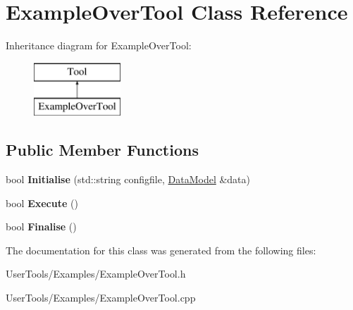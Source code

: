 \hypertarget{classExampleOverTool}{\section{Example\-Over\-Tool Class Reference}
\label{classExampleOverTool}
}
Inheritance diagram for Example\-Over\-Tool\-:\begin{figure}[H]
\begin{center}
\leavevmode
\includegraphics[height=2.000000cm]{classExampleOverTool}
\end{center}
\end{figure}
\subsection*{Public Member Functions}
\begin{DoxyCompactItemize}
\item 
\hypertarget{classExampleOverTool_ac7821b52bdffd736c9f4bb7265f2403c}{bool {\bfseries Initialise} (std\-::string configfile, \hyperlink{classDataModel}{Data\-Model} \&data)}\label{classExampleOverTool_ac7821b52bdffd736c9f4bb7265f2403c}

\item 
\hypertarget{classExampleOverTool_ae43f1902d5b79f6b474ba4b173ab0264}{bool {\bfseries Execute} ()}\label{classExampleOverTool_ae43f1902d5b79f6b474ba4b173ab0264}

\item 
\hypertarget{classExampleOverTool_aaf2c1cee9746ed6e94a9d58d8bc9fcae}{bool {\bfseries Finalise} ()}\label{classExampleOverTool_aaf2c1cee9746ed6e94a9d58d8bc9fcae}

\end{DoxyCompactItemize}


The documentation for this class was generated from the following files\-:\begin{DoxyCompactItemize}
\item 
User\-Tools/\-Examples/Example\-Over\-Tool.\-h\item 
User\-Tools/\-Examples/Example\-Over\-Tool.\-cpp\end{DoxyCompactItemize}
